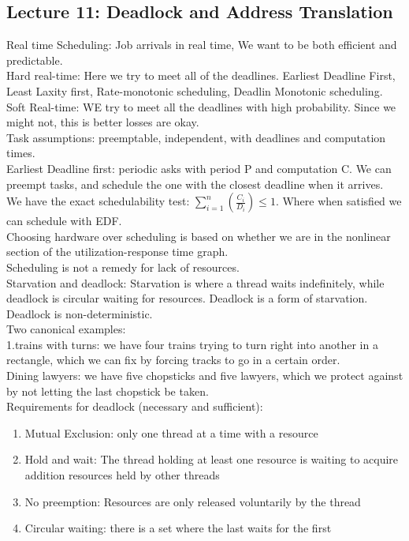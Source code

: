 \documentclass[paper=a4, fontsize=11pt]{scrartcl} %
\numberwithin{equation}{section} %
\numberwithin{figure}{section} %
\numberwithin{table}{section} %
\def \tab {\hspace{.7cm}}
\def \SIN {\sum\limits_{i=1}^n}
\begin{document}
\subsection{Lecture 11: Deadlock and Address Translation}
Real time Scheduling: Job arrivals in real time, We want to be both efficient and predictable. \\
Hard real-time: Here we try to meet all of the deadlines. Earliest Deadline First, Least Laxity first, Rate-monotonic scheduling, Deadlin Monotonic scheduling. \\
Soft Real-time: WE try to meet all the deadlines with high probability. Since we might not, this is better losses are okay. \\
Task assumptions: preemptable, independent, with deadlines and computation times. \\
Earliest Deadline first: periodic asks with period P and computation C. We can preempt tasks, and schedule the one with the closest deadline when it arrives. \\
We have the exact schedulability test: $\SIN (\frac{C_i}{D_i})\leq 1$. Where when satisfied we can schedule with EDF. \\
Choosing hardware over scheduling is based on whether we are in the nonlinear section of the utilization-response time graph. \\
Scheduling is not a remedy for lack of resources. \\
Starvation and deadlock: Starvation is where a thread waits indefinitely, while deadlock is circular waiting for resources. Deadlock is a form of starvation.\\
Deadlock is non-deterministic. \\
Two canonical examples:\\
1.\tab trains with turns: we have four trains trying to turn right into another in a rectangle, which we can fix by forcing tracks to go in a certain order. \\
Dining lawyers: we have five chopsticks and  five lawyers, which we protect against by not letting the last chopstick be taken. \\
Requirements for deadlock (necessary and sufficient):
\begin{enumerate}
	\item Mutual Exclusion: only one thread at a time with a resource
    \item Hold and wait: The thread holding at least one resource is waiting to acquire addition resources held by other threads
    \item No preemption: Resources are only released voluntarily by the thread
    \item Circular waiting: there is a set where the last waits for the first
\end{enumerate}
\end{document}
